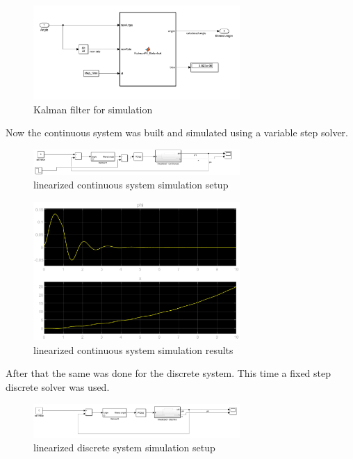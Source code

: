 \begin{figure}[H]
		\centering
		\includegraphics[width=0.7\textwidth]{figures/Kalman_sim.png}
		\caption{Kalman filter for simulation}
		\label{fig:kalman_sim}
\end{figure}
Now the continuous system was built and simulated using a variable step solver.
\begin{figure}[H]
		\centering
		\includegraphics[width=0.7\textwidth]{figures/linear_balan_bot_cont.png}
		\caption{linearized continuous system simulation setup}
		\label{fig:lin_cont_sim}
\end{figure}
\begin{figure}[H]
		\centering
		\includegraphics[width=0.7\textwidth]{figures/linear_balan_bot_cont_sim.eps}
		\caption{linearized continuous system simulation results}
		\label{fig:lin_cont_res}
\end{figure}
After that the same was done for the discrete system. This time a fixed step discrete solver was used.
\begin{figure}[H]
		\centering
		\includegraphics[width=0.7\textwidth]{figures/linear_balan_bot_disc.png}
		\caption{linearized discrete system simulation setup}
		\label{fig:lin_disc_sim}
\end{figure}
